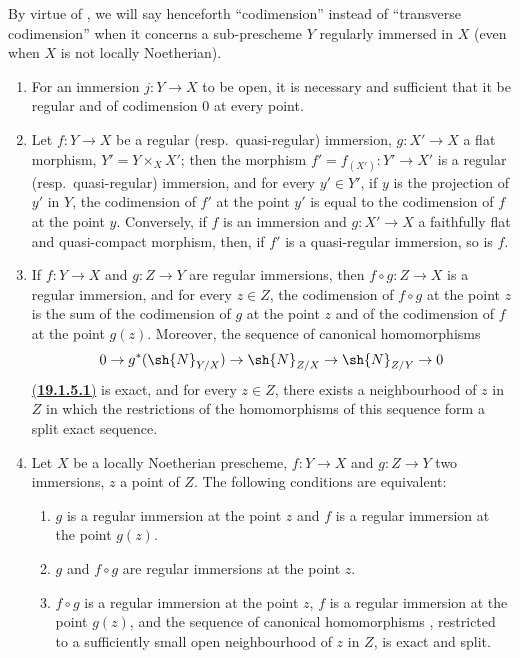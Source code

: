 \begin{env}[19.1.4]
By virtue of , we will say henceforth ``codimension'' instead of ``transverse codimension'' when it concerns a sub-prescheme $Y$ regularly immersed in $X$ (even when $X$ is not locally Noetherian).
\end{env}

\begin{proposition}[19.1.5]
\label{IV.19.1.5}
\medskip\noindent
\begin{enumerate}[label=(\roman*)]
  \item For an immersion $j:Y\to X$ to be open, it is necessary and sufficient that it be regular and of codimension $0$ at every point.
  \item Let $f:Y\to X$ be a regular (resp.\ quasi-regular) immersion, $g:X'\to X$ a flat morphism, $Y'=Y\times_X X'$; then the morphism $f'=f_{(X')}:Y'\to X'$ is a regular (resp.\ quasi-regular) immersion, and for every $y'\in Y'$, if $y$ is the projection of $y'$ in $Y$, the codimension of $f'$ at the point $y'$ is equal to the codimension of $f$ at the point $y$.
Conversely, if $f$ is an immersion and $g:X'\to X$ a faithfully flat and quasi-compact morphism, then, if $f'$ is a quasi-regular immersion, so is $f$.
  \item If $f:Y\to X$ and $g:Z\to Y$ are regular immersions, then $f\circ g:Z\to X$ is a regular immersion, and for every $z\in Z$, the codimension of $f\circ g$ at the point $z$ is the sum of the codimension of $g$ at the point $z$ and of the codimension of $f$ at the point $g(z)$.
Moreover, the sequence of canonical homomorphisms 
\[
  0\to g^*(\sh{N}_{Y/X})\to\sh{N}_{Z/X}\to\sh{N}_{Z/Y}\to 0
\]
\hyperref[IV.19.1.5.1]{(\textbf{19.1.5.1})}
\label{IV.19.1.5.1}
is exact, and for every $z\in Z$, there exists a neighbourhood of $z$ in $Z$ in which the restrictions of the homomorphisms of this sequence form a split exact sequence.
  \item Let $X$ be a locally Noetherian prescheme, $f:Y\to X$ and $g:Z\to Y$ two immersions, $z$ a point of $Z$.
The following conditions are equivalent:
  \begin{enumerate}[label=\emph{\alph*)}]
    \item $g$ is a regular immersion at the point $z$ and $f$ is a regular immersion at the point $g(z)$.
    \item $g$ and $f\circ g$ are regular immersions at the point $z$.
    \item $f\circ g$ is a regular immersion at the point $z$, $f$ is a regular immersion at the point $g(z)$, and the sequence of canonical homomorphisms , restricted to a sufficiently small open neighbourhood of $z$ in $Z$, is exact and split.

\end{enumerate}
\end{enumerate}
\end{proposition}
